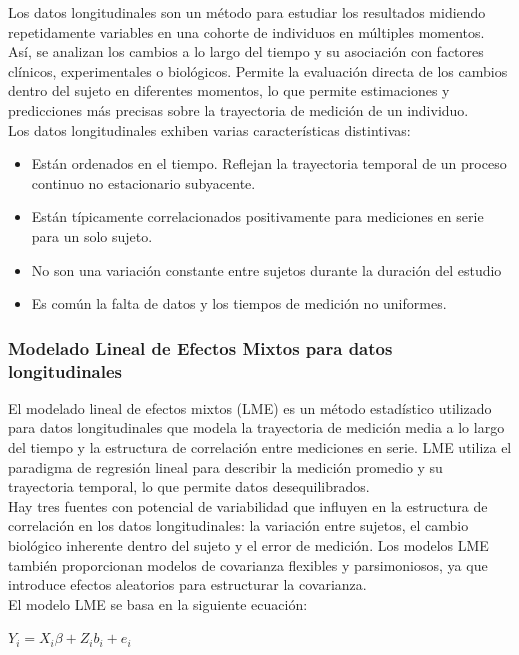 	Los datos longitudinales son un método para estudiar los resultados midiendo repetidamente variables en una cohorte de individuos en múltiples momentos. Así, se analizan los cambios a lo largo del tiempo y su asociación con factores clínicos, experimentales o biológicos. Permite la evaluación directa de los cambios dentro del sujeto en diferentes momentos, lo que permite estimaciones y predicciones más precisas sobre la trayectoria de medición de un individuo.\\ Los datos longitudinales exhiben varias características distintivas:
	\begin{itemize}
		\item Están ordenados en el tiempo. Reflejan la trayectoria temporal de un proceso continuo no estacionario subyacente.
		\item Están típicamente correlacionados positivamente para mediciones en serie para un solo sujeto.
		\item No son una variación constante entre sujetos durante la duración del estudio
		\item Es común la falta de datos y los tiempos de medición no uniformes.
	\end{itemize}
	
	\subsubsection{Modelado Lineal de Efectos Mixtos para datos longitudinales}
	
	El modelado lineal de efectos mixtos (LME) es un método estadístico utilizado para datos longitudinales que modela la trayectoria de medición media a lo largo del tiempo y la estructura de correlación entre mediciones en serie. LME utiliza el paradigma de regresión lineal para describir la medición promedio y su trayectoria temporal, lo que permite datos desequilibrados.\\
	
	Hay tres fuentes con potencial de variabilidad que influyen en la estructura de correlación en los datos longitudinales: la variación entre sujetos, el cambio biológico inherente dentro del sujeto y el error de medición. Los modelos LME también proporcionan modelos de covarianza flexibles y parsimoniosos, ya que introduce efectos aleatorios para estructurar la covarianza.\\
	
	El modelo LME se basa en la siguiente ecuación:
	\begin{center}
		$Y_{i} = X_{i}\beta + Z_{i}b_{i} + e_{i}$
	\end{center}
	
